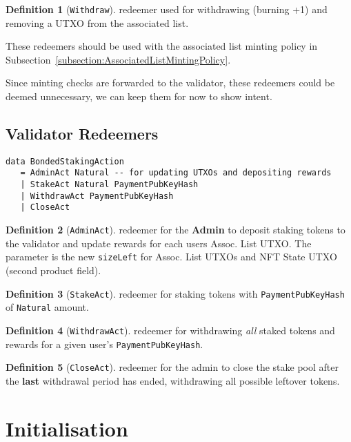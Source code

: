 \documentclass[10pt, a4paper]{article}
\theoremstyle{definition}
\newtheorem{definition}{Definition}[section]
\begin{document}
\begin{definition}[\texttt{Withdraw}]\label{def:Withdraw} redeemer used for withdrawing (burning +1) and removing a UTXO from the associated list.
\end{definition}

These redeemers should be used with the associated list minting policy in Subsection~\ref{subsection:AssociatedListMintingPolicy}.

Since minting checks are forwarded to the validator, these redeemers could be deemed unnecessary, we can keep them for now to show intent.

\subsection{Validator Redeemers}
\begin{verbatim}
data BondedStakingAction
   = AdminAct Natural -- for updating UTXOs and depositing rewards
   | StakeAct Natural PaymentPubKeyHash
   | WithdrawAct PaymentPubKeyHash
   | CloseAct
\end{verbatim}

\begin{definition}[\texttt{AdminAct}]\label{def:AdminAct} redeemer for the \textbf{Admin} to deposit staking tokens to the validator and update rewards for each users Assoc. List UTXO. The parameter is the new \texttt{sizeLeft} for Assoc. List UTXOs and NFT State UTXO (second product field).
\end{definition}

\begin{definition}[\texttt{StakeAct}]\label{def:StakeAct} redeemer for staking tokens with \texttt{PaymentPubKeyHash} of \texttt{Natural} amount.
\end{definition}

\begin{definition}[\texttt{WithdrawAct}]\label{def:WithdrawAct} redeemer for withdrawing \textit{all} staked tokens and rewards for a given user's \texttt{PaymentPubKeyHash}.
\end{definition}

\begin{definition}[\texttt{CloseAct}]\label{def:CloseAct} redeemer for the admin to close the stake pool after the \textbf{last} withdrawal period has ended, withdrawing all possible leftover tokens.
\end{definition}

\section{Initialisation}\label{section:initialisation}
\end{document}
